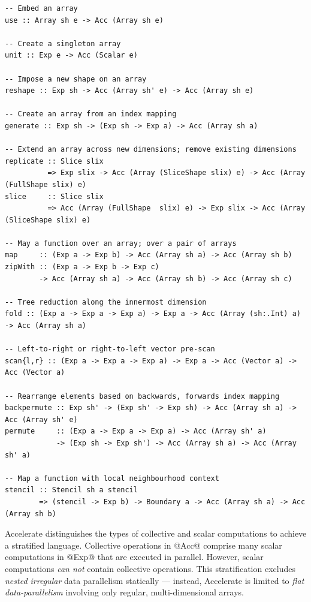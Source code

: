 \begin{lstlisting}[style=haskell,
    numbers=none,
    float=t,
    label={lst:acc_operations},
    caption={[Core Accelerate array operations] Summary of Accelerate's core
        collective array operations, omitting \code{Shape} and \code{Elt} class
        constraints for brevity. In addition, there are other flavours of folds
        and scans as well as segmented versions of these.}]
-- Embed an array
use :: Array sh e -> Acc (Array sh e)

-- Create a singleton array
unit :: Exp e -> Acc (Scalar e)

-- Impose a new shape on an array
reshape :: Exp sh -> Acc (Array sh' e) -> Acc (Array sh e)

-- Create an array from an index mapping
generate :: Exp sh -> (Exp sh -> Exp a) -> Acc (Array sh a)

-- Extend an array across new dimensions; remove existing dimensions
replicate :: Slice slix
          => Exp slix -> Acc (Array (SliceShape slix) e) -> Acc (Array (FullShape slix) e)
slice     :: Slice slix
          => Acc (Array (FullShape  slix) e) -> Exp slix -> Acc (Array (SliceShape slix) e)

-- May a function over an array; over a pair of arrays
map     :: (Exp a -> Exp b) -> Acc (Array sh a) -> Acc (Array sh b)
zipWith :: (Exp a -> Exp b -> Exp c)
        -> Acc (Array sh a) -> Acc (Array sh b) -> Acc (Array sh c)

-- Tree reduction along the innermost dimension
fold :: (Exp a -> Exp a -> Exp a) -> Exp a -> Acc (Array (sh:.Int) a) -> Acc (Array sh a)

-- Left-to-right or right-to-left vector pre-scan
scan{l,r} :: (Exp a -> Exp a -> Exp a) -> Exp a -> Acc (Vector a) -> Acc (Vector a)

-- Rearrange elements based on backwards, forwards index mapping
backpermute :: Exp sh' -> (Exp sh' -> Exp sh) -> Acc (Array sh a) -> Acc (Array sh' e)
permute     :: (Exp a -> Exp a -> Exp a) -> Acc (Array sh' a)
            -> (Exp sh -> Exp sh') -> Acc (Array sh a) -> Acc (Array sh' a)

-- Map a function with local neighbourhood context
stencil :: Stencil sh a stencil
        => (stencil -> Exp b) -> Boundary a -> Acc (Array sh a) -> Acc (Array sh b)
\end{lstlisting}

Accelerate distinguishes the types of collective and scalar computations to
achieve a stratified language. Collective operations in @Acc@ comprise many
scalar computations in @Exp@ that are executed in parallel. However, scalar
computations \emph{can not} contain collective operations. This stratification
excludes \emph{nested irregular} data parallelism statically --- instead,
Accelerate is limited to \emph{flat data-parallelism} involving only regular,
multi-dimensional arrays.

